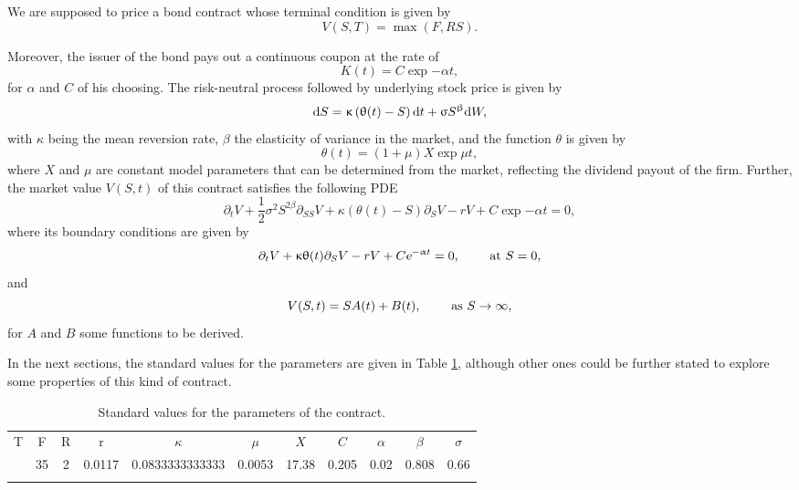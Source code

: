 \noindent We are supposed to price a bond contract whose terminal condition is given by
\begin{equation}
	V(S,T) = \max \left(F, RS\right).
\end{equation}

Moreover, the issuer of the bond pays out a continuous coupon at the rate of 
\begin{equation}
	K(t) = C \exp{-\alpha t},
\end{equation}
for $\alpha$ and $C$ of his choosing. The risk-neutral process followed by underlying stock price is given by
\begin{equation}
	\text{\rm d} S = \upkappa \left(\uptheta(t)  - S\right)\text{\rm d} t + \upsigma S^\upbeta \text{\rm d} W,
\end{equation}
with $\kappa$ being the mean reversion rate, $\beta$ the elasticity of variance in the market, and the function $\theta$ is given by
\begin{equation}
	\theta(t) = (1+\mu)X\exp{\mu t},
\end{equation}
where $X$ and $\mu$ are constant model parameters that can be determined from the market, reflecting the dividend payout of the firm. Further, the market value $V(S,t)$ of this contract satisfies the following PDE
\begin{equation}\label{general_pde}
	\partial_t V + \frac{1}{2}\sigma^2 S^{2\beta}\partial_{SS}V + \kappa (\theta(t) - S)\partial_SV - rV + C\exp{-\alpha t} = 0,
\end{equation}
where its boundary conditions are given by
\begin{equation}\label{pde_S0}
	\partial_t V + \upkappa \uptheta(t) \partial_S V - rV + C\text{\sl e}^{-\upalpha t} = 0, \quad\quad \text{ at } S= 0,
\end{equation}
and
\begin{equation}
	V(S,t) = S A(t) + B(t), \quad\quad \text{ as } S\to\infty,
\end{equation}
for $A$ and $B$ some functions to be derived.

In the next sections, the standard values for the parameters are given in Table \ref{parameters}, although other ones could be further stated to explore some properties of this kind of contract.

\begin{table}[h!]
	\setlength{\tabcolsep}{8pt}
	\renewcommand{\arraystretch}{1.2}
	\begin{tabular}{ccccccccccc}
		T & F & R & r & $\kappa$ & $\mu$ & $X$ & $C$ & $\alpha$ & $\beta$ & $\sigma$\\\addlinespace[0.02cm]\hline\hline\addlinespace[0.12cm]
		3 & 35 & 2 & 0.0117 & 0.0833333333333 & 0.0053 & 17.38 & 0.205 & 0.02 & 0.808 & 0.66\\\addlinespace[0.05cm]\hline
	\end{tabular}
	\vspace{0.3cm}
	\caption{Standard values for the parameters of the contract.}\label{parameters}
\end{table}